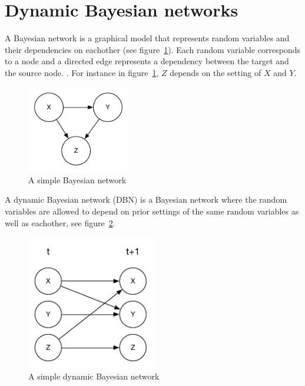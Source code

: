 \section{Dynamic Bayesian networks}
\label{sec:dbn}

A Bayesian network is a graphical model that represents random variables and
their dependencies on eachother (see figure~\ref{fig:bn}). Each random variable
corresponds to a node and a directed edge represents a dependency between the
target and the source node. \parencite{heckerman1998tutorial}. For instance in
figure~\ref{fig:bn}, $Z$ depends on the setting of $X$ and $Y$. 

\begin{figure}[H]
\centering
\includegraphics[width=0.4\textwidth]{images/BN.pdf}
\caption{A simple Bayesian network}
\label{fig:bn}
\end{figure}

A dynamic Bayesian network (DBN) is a Bayesian network where the random
variables are allowed to depend on prior settings of the same random variables
as well as eachother, see figure~\ref{fig:dbn}.

\begin{figure}[H]
    \centering
    \includegraphics[width=0.5\textwidth]{images/DBN.pdf}
    \caption{A simple dynamic Bayesian network}
    \label{fig:dbn}
\end{figure}

